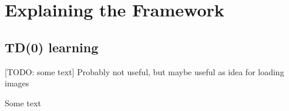 \documentclass[a4paper]{article}
\begin{document}
\section{Explaining the Framework}


\subsection*{TD(0) learning}
[TODO: some text]
Probably not useful, but maybe useful as idea for loading images

\begin{minipage}{\columnwidth}
\makeatletter
\newcommand{\@captype}{figure}
\makeatother
\centering
\captionsetup[subfigure]{labelformat=empty}
 \qquad \qquad%
\caption{Some text}
\label{fig-data-prep}
\end{minipage}
\end{document}
